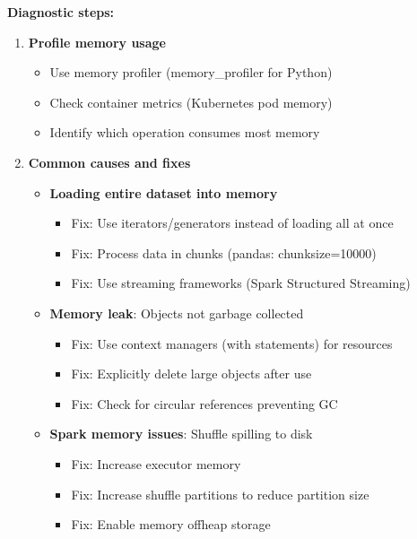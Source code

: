 \textbf{Diagnostic steps:}
\begin{enumerate}
    \item \textbf{Profile memory usage}
        \begin{itemize}
            \item Use memory profiler (memory\_profiler for Python)
            \item Check container metrics (Kubernetes pod memory)
            \item Identify which operation consumes most memory
        \end{itemize}

    \item \textbf{Common causes and fixes}
        \begin{itemize}
            \item \textbf{Loading entire dataset into memory}
                \begin{itemize}
                    \item Fix: Use iterators/generators instead of loading all at once
                    \item Fix: Process data in chunks (pandas: chunksize=10000)
                    \item Fix: Use streaming frameworks (Spark Structured Streaming)
                \end{itemize}

            \item \textbf{Memory leak}: Objects not garbage collected
                \begin{itemize}
                    \item Fix: Use context managers (with statements) for resources
                    \item Fix: Explicitly delete large objects after use
                    \item Fix: Check for circular references preventing GC
                \end{itemize}

            \item \textbf{Spark memory issues}: Shuffle spilling to disk
                \begin{itemize}
                    \item Fix: Increase executor memory
                    \item Fix: Increase shuffle partitions to reduce partition size
                    \item Fix: Enable memory offheap storage
                \end{itemize}
        \end{itemize}
\end{enumerate}

